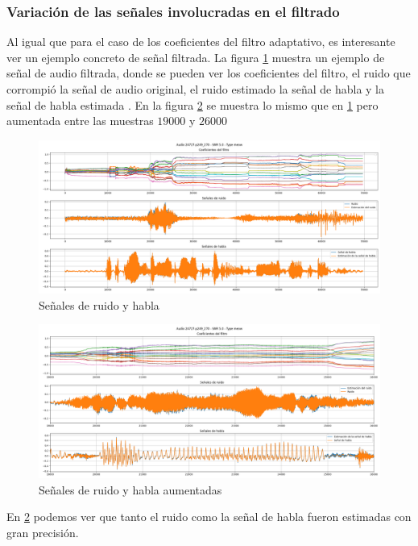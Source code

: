 \subsubsection{Variación de las señales involucradas en el filtrado}

Al igual que para el caso de los coeficientes del filtro adaptativo, es interesante ver un ejemplo concreto de señal filtrada. La figura \ref{fig:ch6_señal_ruido_habla} muestra un ejemplo de señal de audio filtrada, donde se pueden ver los coeficientes del filtro, el ruido que corrompió la señal de audio original, el ruido estimado la señal de habla y la señal de habla estimada . En la figura \ref{fig:ch6_señal_ruido_habla_aumentada} se muestra lo mismo que en \ref{fig:ch6_señal_ruido_habla} pero aumentada entre las muestras $19000$ y $26000$

\begin{figure}
	\centering
	\centerline{\includegraphics[scale=0.35]{images/ch6/af/signals/signals.png}}
	\caption{Señales de ruido y habla}
	\label{fig:ch6_señal_ruido_habla}
\end{figure}


\begin{figure}
	\centering
	\centerline{\includegraphics[scale=0.35]{images/ch6/af/signals/zoomed_signals.png}}
	\caption{Señales de ruido y habla aumentadas}
	\label{fig:ch6_señal_ruido_habla_aumentada}
\end{figure}

En \ref{fig:ch6_señal_ruido_habla_aumentada} podemos ver que tanto el ruido como la señal de habla fueron estimadas con gran precisión.